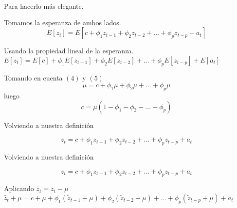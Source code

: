 \documentclass[11pt]{beamer}
\begin{document}
\begin{frame}{Para hacerlo más elegante.}
\begin{block}{Tomamos la esperanza de ambos lados.}
$$ E[z_t] = E[c + \phi_1 z_{t-1} + \phi_2 z_{t-2} + \dots + \phi_p z_{t-p} + a_t] $$
\end{block}
\begin{block}{Usando la propiedad lineal de la esperanza.}
$ E[z_t] = E[c] + \phi_1 E[z_{t-1}] + \phi_2 E[z_{t-2}] + \dots + \phi_p E[z_{t-p}] + E[a_t] $
\end{block}
\begin{block}{Tomando en cuenta $(4)$ y $(5)$}
$$ \mu = c + \phi_1 \mu + \phi_2 \mu + \dots + \phi_p \mu $$
luego 
\begin{equation}
	c = \mu ( 1 - \phi_1 - \phi_2 - \dots - \phi_p )
\end{equation}

\end{block}
\end{frame}

\begin{frame}{Volviendo a nuestra definición}
\begin{block}{}
	$$ z_t = c + \phi_1 z_{t-1} + \phi_2 z_{t-2} + \dots + \phi_p z_{t-p} + a_t $$
\end{block}

\end{frame}

\begin{frame}{Volviendo a nuestra definición}
\begin{block}{}
	$$ z_t = c + \phi_1 z_{t-1} + \phi_2 z_{t-2} + \dots + \phi_p z_{t-p} + a_t $$
\end{block}
\begin{block}{Aplicando $\tilde{z_t}=z_t-\mu$}
	$ \tilde{z_t} + \mu = c + \mu + \phi_1 (\tilde{z}_{t-1} + \mu) + \phi_2 (\tilde{z}_{t-2} + \mu) + \dots + \phi_p (\tilde{z}_{t-p} + \mu) + a_t $
\end{block}

\end{frame}
\end{document}
